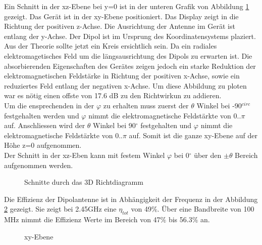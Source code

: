 Ein Schnitt in der xz-Ebene bei y=0 ist in der unteren Grafik von Abbildung \ref{fig:Schnittgemessen} gezeigt. Das Gerät ist in der xy-Ebene positioniert. Das Display zeigt in die Richtung der positiven z-Achse. Die Ausrichtung der Antenne im Gerät ist entlang der y-Achse. Der Dipol ist im Ursprung des Koordinatensystems plaziert. Aus der Theorie sollte jetzt ein Kreis ersichtlich sein. Da ein radiales elektromagetisches Feld um die längsausrichtung des Dipols zu erwarten ist. Die absorbierenden Eigenschaften des Gerätes zeigen jedoch ein starke Reduktion der elektromagnetischen Feldstärke in Richtung der positiven x-Achse, sowie ein reduziertes Feld entlang der negativen x-Achse. Um diese Abbildung zu ploten war es nötig einen offste von 17.6 dB zu den Richtwirkun zu addieren.\\
Um die ensprechenden in der $\varphi$ zu erhalten muss zuerst der $\theta$ Winkel bei -90$^{circ}$ festgehalten werden und $\varphi$ nimmt die elektromagnetische Feldstärkte von $0..\pi$ auf. Anschliessen wird der $\theta$ Winkel bei 90$^{\circ}$ festgehalten  und $\varphi$ nimmt die elektromagnetische Feldstärkte von $0..\pi$ auf. Somit ist die ganze xy-Ebene auf der Höhe z=0 aufgenommen.\\
Der Schnitt in der xz-Eben kann mit festem Winkel $\varphi$ bei 0$^{\circ}$ über den  $\pm \theta$ Bereich aufgenommen werden.
\begin{figure}[!h]
	\centering
	\begingroup
	
	\endgroup
	\caption{Schnitte durch das 3D Richtdiagramm}
	\label{fig:Schnittgemessen}
\end{figure}
\newpage
Die Effizienz der Dipolantenne ist in Abhängigkeit der Frequenz in der Abbildung \ref{fig:Effizienz_gemessen} gezeigt. Sie zeigt bei 2.45GHz eine $\eta_{tot}$ von 49$\%$. Über eine Bandbreite von 100 MHz nimmt die Effizienz Werte im Bereich von 47$\%$ bis 56.3$\%$ an.\\
\begin{figure}[!h]
	\centering
	\begingroup
	
	\endgroup
	\caption{xy-Ebene}\label{fig:Effizienz_gemessen}
\end{figure}



